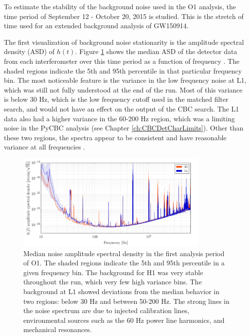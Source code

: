 To estimate the stability of the background noise used in the O1
analysis, the time period of September 12 - October 20, 2015 is
studied. This is the stretch
of time used for an extended background analysis of GW150914.

The first
visualization of background noise stationarity is the amplitude
spectral density (ASD) of $h(t)$. Figure \ref{fig:median-asd}
shows the
median ASD of the detector data from each interferometer over this
time period as a function of frequency \cite{GW150914-DETCHAR}. 
The shaded regions indicate
the 5th and 95th percentile in that particular frequency bin.
The most noticeable feature is the variance in the low frequency
noise at L1, which was still not fully understood at the end of the run.
Most of this variance is below 30 Hz, which is the
low frequency cutoff used in the matched filter search, and would
not have an effect on the output of the CBC search. The L1 data
also had a higher variance in the 60-200 Hz region, which was a
limiting noise in the PyCBC analysis (see Chapter \ref{ch:CBCDetCharLimits}). 
Other than these two regions,
the spectra appear to be consistent and have reasonable variance
at all frequencies \cite{GW150914-DETCHAR}.

\begin{figure}[ht!]%
\includegraphics[width=0.85\textwidth]{figures/O1/H1L1-OBSERVING_GW150914_PERCENTILE_SPECTRUM-1126073342-3309798}
\caption[Median noise ASD in O1]{Median noise amplitude spectral density %
         in the first analysis period of O1. The shaded regions indicate %
         the 5th and 95th percentile in a given frequency bin. The background %
         for H1 was very stable throughout the run, which very few high %
         variance bins. The background at L1 showed deviations from the %
         median behavior in two regions: below 30 Hz and between 50-200 Hz. %
         The strong lines in the noise spectrum are due to injected calibration %
         lines, environmental sources such as the 60 Hz power line harmonics, %
         and mechanical resonances.
         }
\label{fig:median-asd}
\end{figure}

